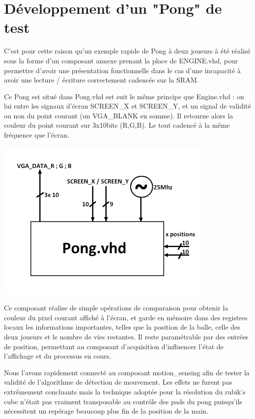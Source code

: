 \documentclass[10pt,a4paper]{report}
\begin{document}
\section{Développement d'un "Pong" de test}

C'est pour cette raison qu'un exemple rapide de Pong à deux joueurs à été réalisé sous la forme d'un composant annexe prenant la place de ENGINE.vhd, pour permettre d'avoir une présentation fonctionnelle dans le cas d'une incapacité à avoir une lecture / écriture correctement cadencée sur la SRAM.

Ce Pong est situé dans Pong.vhd est suit le même principe que Engine.vhd : on lui entre les signaux d'écran SCREEN\_X et SCREEN\_Y, et un signal de validité ou non du point courant (un VGA\_BLANK en somme). Il retourne alors la couleur du point courant sur 3x10bits (R,G,B). Le tout cadencé à la même fréquence que l'écran.

\begin{center}
\includegraphics[width=300pt]{gfx/pong.png}
\end{center}

Ce composant réalise de simple opérations de comparaison pour obtenir la couleur du pixel courant affiché à l'écran, et garde en mémoire dans des registres locaux les informations importantes, telles que la position de la balle, celle des deux joueurs et le nombre de vies restantes. Il reste paramétrable par des entrées de position, permettant au composant d'acquisition d'influencer l'état de l'affichage et du processus en cours.

Nous l'avons rapidement connecté au composant motion\_sensing afin de tester la validité de l'algorithme de détection de mouvement. Les effets ne furent pas extrêmement concluants mais la technique adoptée pour la résolution du rubik's cube n'était pas vraiment transposable au contrôle des pads du pong puisqu'ils nécessitent un repérage beaucoup plus fin de la position de la main. 
\end{document}
